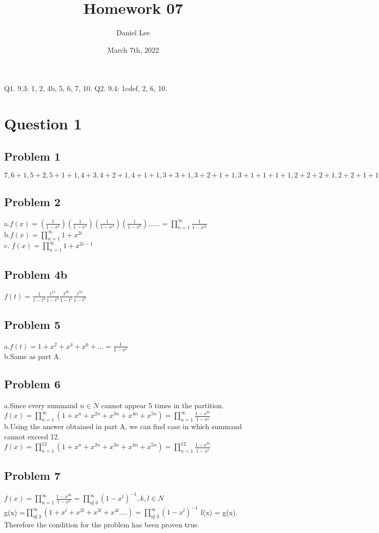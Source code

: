 \documentclass[15pt]{article}
\title{Homework 07}
\author{Daniel Lee }
\date{March 7th,  2022}
\begin{document}
\maketitle
\newpage
\justify
Q1.
9.3: 1, 2, 4b, 5, 6, 7, 10.
Q2.
9.4: 1cdef, 2, 6, 10.
\section*{Question 1}
\subsection*{Problem 1}
$7, 6 + 1, 5 + 2, 5 + 1 + 1, 4 + 3, 4 + 2 + 1, 4 + 1 + 1, 3 + 3 + 1, 3 + 2 + 1 +1, 3 + 1 + 1 + 1 + 1,2 + 2 + 2 + 1, 2 + 2 + 1 + 1 + 1, 2 + 1 +1 +1 +1 +1, 1 + 1 +1 +1+1+1+1$
\subsection*{Problem 2}
a.$f(x)=(\frac{1}{1-x^2})(\frac{1}{1-x^4})(\frac{1}{1-x^4})(\frac{1}{1-x^6})......=\prod_{n=1}^{\infty}\frac{1}{1-x^{2i}}$\\
b.$f(x) = \prod_{n=1}^{\infty}{1+x^{2i}}$\\
c. $f(x) = \prod_{n=1}^{\infty}{1+x^{2i-1}}$
\subsection*{Problem 4b}
$f(t)=\frac{1}{1-t^2} \frac{t^{12}}{1-t^3}\frac{t^{20}}{1-t^5} \frac{t^{35}}{1-t^7}$
\subsection*{Problem 5}
a.$f(t)=1+x^2 +x^4 + x^6 +...= \frac{1}{1 - x^2} $ \\
b.Same as part A.
\subsection*{Problem 6}
a.Since every summand $n \in N$ cannot appear 5 times in the partition.  $f(x)= \prod_{n=1}^{\infty}(1+x^n + x^{2n} + x^{3n} + x^{4n} + x^{5n}) = \prod_{n=1}^{\infty}\frac{1-x^{6i}}{1-x^i}$\\
b.Using the answer obtained in part A, we can find case in which summand cannot exceed 12. $f(x)= \prod_{n=1}^{12}(1+x^n + x^{2n} + x^{3n} + x^{4n} + x^{5n})=\prod_{n=1}^{12}\frac{1-x^{6i}}{1-x^i}$
\subsection*{Problem 7}
$f(x)= \prod_{n=1}^{\infty}\frac{1-x^{3k}}{1-x^k}= \prod_{n\not| \:3}^{\infty}(1-x^l)^{-1}, k,l \in N$\\
g(x) =$\prod_{n\not| \:3}^{\infty}(1+x^l + x^{2l} + x^{3l} + x^{4l}....)= \prod_{n\not| \:3}^{\infty}(1-x^l)^{-1}$
f(x) = g(x). \\Therefore the condition for the problem has been proven true. 
\end{document}
